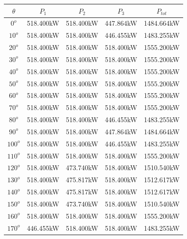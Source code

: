 	\singlespacing
	\begin{table}[H]
	    \centering
	    \begin{tabular}{|c|c|c|c|c|}
	        \hline
	        $\theta$ & $P_{1}$ & $P_{2}$ & $P_{3}$ & $P_ {tot}$ \\	 
	        \hline
	        $0^{o}$ & 518.400kW & 518.400kW & 447.864kW & 1484.664kW  \\
	        \hline
	        $10^{o}$ & 518.400kW & 518.400kW & 446.455kW & 1483.255kW  \\
	        \hline
	        $20^{o}$ & 518.400kW & 518.400kW & 518.400kW & 1555.200kW  \\
	        \hline
	        $30^{o}$ & 518.400kW & 518.400kW & 518.400kW & 1555.200kW  \\
	        \hline
	        $40^{o}$ & 518.400kW & 518.400kW & 518.400kW & 1555.200kW  \\
	        \hline
	        $50^{o}$ & 518.400kW & 518.400kW & 518.400kW & 1555.200kW  \\
	        \hline
	        $60^{o}$ & 518.400kW & 518.400kW & 518.400kW & 1555.200kW  \\
	        \hline
	        $70^{o}$ & 518.400kW & 518.400kW & 518.400kW & 1555.200kW  \\
	        \hline
	        $80^{o}$ & 518.400kW & 518.400kW & 446.455kW &  1483.255kW \\
	        \hline
	        $90^{o}$ & 518.400kW & 518.400kW & 447.864kW & 1484.664kW  \\
	        \hline
	        $100^{o}$ & 518.400kW & 518.400kW & 446.455kW & 1483.255kW  \\
	        \hline
	        $110^{o}$ & 518.400kW & 518.400kW & 518.400kW & 1555.200kW  \\
	        \hline
	        $120^{o}$ & 518.400kW & 473.740kW & 518.400kW & 1510.540kW  \\
	        \hline
	        $130^{o}$ & 518.400kW & 475.817kW & 518.400kW & 1512.617kW  \\
	        \hline
	        $140^{o}$ & 518.400kW & 475.817kW & 518.400kW & 1512.617kW  \\
	        \hline
	        $150^{o}$ & 518.400kW & 473.740kW & 518.400kW & 1510.540kW  \\
	        \hline
	        $160^{o}$ & 518.400kW & 518.400kW & 518.400kW & 1555.200kW  \\
	        \hline
	        $170^{o}$ & 446.455kW & 518.400kW & 518.400kW & 1483.255kW 
	        \\
	        \hline

\end{tabular}
\end{table}
